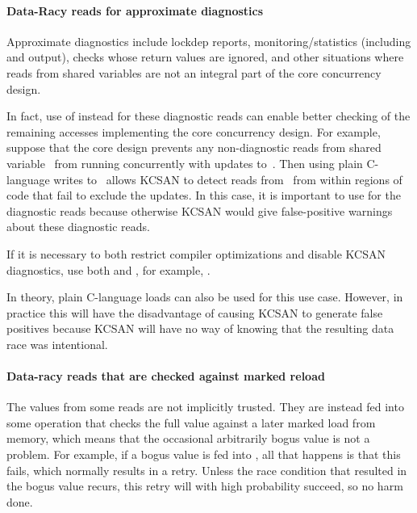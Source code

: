 \paragraph{Data-Racy reads for approximate diagnostics}

Approximate diagnostics include lockdep reports, monitoring/statistics
(including  and  output), 
checks whose return values are ignored, and other situations where reads
from shared variables are not an integral part of the core concurrency design.

In fact, use of  instead  for these diagnostic
reads can enable better checking of the remaining accesses implementing
the core concurrency design.
For example, suppose that the core design prevents any non-diagnostic
reads from shared variable~ from running concurrently with updates
to~.
Then using plain C-language writes to~ allows KCSAN to detect reads
from~ from within regions of code that fail to exclude the updates.
In this case, it is important to use  for the diagnostic
reads because otherwise KCSAN would give false-positive warnings about
these diagnostic reads.

If it is necessary to both restrict compiler optimizations and disable
KCSAN diagnostics, use both  and , for example,
.

In theory, plain C-language loads can also be used for this use case.
However, in practice this will have the disadvantage of causing KCSAN
to generate false positives because KCSAN will have no way of knowing
that the resulting data race was intentional.


\paragraph{Data-racy reads that are checked against marked reload}

The values from some reads are not implicitly trusted.
They are instead fed into some operation that checks the full value
against a later marked load from memory, which means that the occasional
arbitrarily bogus value is not a problem.
For example, if a bogus value is fed into , all that happens
is that this  fails, which normally results in a retry.
Unless the race condition that resulted in the bogus value recurs, this
retry will with high probability succeed, so no harm done.

